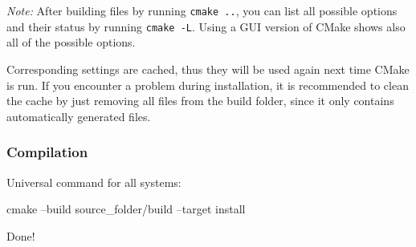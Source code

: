 \textit{Note:} After building files by running \texttt{cmake ..}, you can list all possible options and their status by running \texttt{cmake -L}. 
Using a GUI version of CMake shows also all of the possible options.   

Corresponding settings are cached, thus they will be used again next time CMake is run.
If you encounter a problem during installation, it is recommended to clean the cache by just removing all files from the build folder, since it only contains automatically generated files. 


\subsubsection{Compilation}
Universal command for all systems:
\begin{listing}[mybash]
cmake --build {source_folder}/build --target install
\end{listing}

Done!

